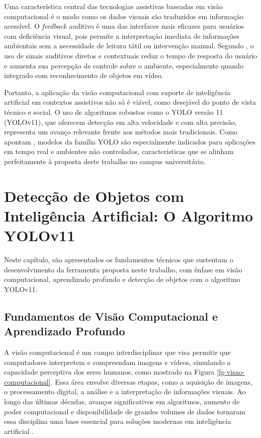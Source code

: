 Uma característica central das tecnologias assistivas baseadas em visão computacional é o modo como os dados visuais são traduzidos em informação acessível. O \textit{feedback} auditivo é uma das interfaces mais eficazes para usuários com deficiência visual, pois permite a interpretação imediata de informações ambientais sem a necessidade de leitura tátil ou intervenção manual. Segundo , o uso de sinais auditivos diretos e contextuais reduz o tempo de resposta do usuário e aumenta sua percepção de controle sobre o ambiente, especialmente quando integrado com reconhecimento de objetos em vídeo.

Portanto, a aplicação da visão computacional com suporte de inteligência artificial em contextos assistivos não só é viável, como desejável do ponto de vista técnico e social. O uso de algoritmos robustos como o YOLO versão 11 (YOLOv11), que oferecem detecção em alta velocidade e com alta precisão, representa um avanço relevante frente aos métodos mais tradicionais. Como apontam , modelos da família YOLO são especialmente indicados para aplicações em tempo real e ambientes não controlados, características que se alinham perfeitamente à proposta deste trabalho no campus universitário.

\section{\textbf{Detecção de Objetos com Inteligência Artificial: O Algoritmo YOLOv11}}

Neste capítulo, são apresentados os fundamentos técnicos que sustentam o desenvolvimento da ferramenta proposta neste trabalho, com ênfase em visão computacional, aprendizado profundo e detecção de objetos com o algoritmo YOLOv11.

\subsection{\textbf{Fundamentos de Visão Computacional e Aprendizado Profundo}}

A visão computacional é um campo interdisciplinar que visa permitir que computadores interpretem e compreendam imagens e vídeos, simulando a capacidade perceptiva dos seres humanos, como mostrado na Figura \ref{fg-visao-computacional}. Essa área envolve diversas etapas, como a aquisição de imagens, o processamento digital, a análise e a interpretação de informações visuais. Ao longo das últimas décadas, avanços significativos em algoritmos, aumento de poder computacional e disponibilidade de grandes volumes de dados tornaram essa disciplina uma base essencial para soluções modernas em inteligência artificial  \cite{szeliski2022}.

